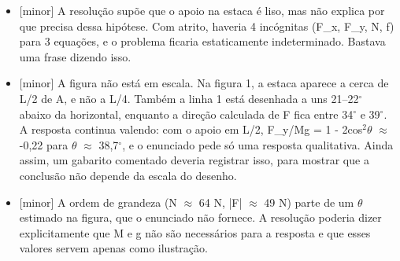 \documentclass{article}%
\begin{document}
\begin{itemize}%
\item%
{[}minor{]} A resolução supõe que o apoio na estaca é liso, mas não explica por que precisa dessa hipótese. Com atrito, haveria 4 incógnitas (F\_x, F\_y, N, f) para 3 equações, e o problema ficaria estaticamente indeterminado. Bastava uma frase dizendo isso.%
\item%
{[}minor{]} A figura não está em escala. Na figura 1, a estaca aparece a cerca de L/2 de A, e não a L/4. Também a linha 1 está desenhada a uns 21--22$^\circ$ abaixo da horizontal, enquanto a direção calculada de F fica entre 34$^\circ$ e 39$^\circ$. A resposta continua valendo: com o apoio em L/2, F\_y/Mg = 1 - 2cos$^2$$\theta$ $\approx$ -0,22 para $\theta$ $\approx$ 38,7$^\circ$, e o enunciado pede só uma resposta qualitativa. Ainda assim, um gabarito comentado deveria registrar isso, para mostrar que a conclusão não depende da escala do desenho.%
\item%
{[}minor{]} A ordem de grandeza (N $\approx$ 64 N, |F| $\approx$ 49 N) parte de um $\theta$ estimado na figura, que o enunciado não fornece. A resolução poderia dizer explicitamente que M e g não são necessários para a resposta e que esses valores servem apenas como ilustração.%
\end{itemize}%
\end{document}
